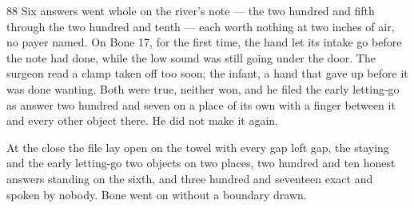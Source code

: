 \begin{CRchronicle}{88}
Six answers went whole on the river’s note --- the two hundred and fifth through the two hundred and tenth --- each worth nothing at two inches of air, no payer named. On Bone 17, for the first time, the hand let its intake go before the note had done, while the low sound was still going under the door. The surgeon read a clamp taken off too soon; the infant, a hand that gave up before it was done wanting. Both were true, neither won, and he filed the early letting-go as answer two hundred and seven on a place of its own with a finger between it and every other object there. He did not make it again.

At the close the file lay open on the towel with every gap left gap, the staying and the early letting-go two objects on two places, two hundred and ten honest answers standing on the sixth, and three hundred and seventeen exact and spoken by nobody. Bone went on without a boundary drawn.
\end{CRchronicle}
